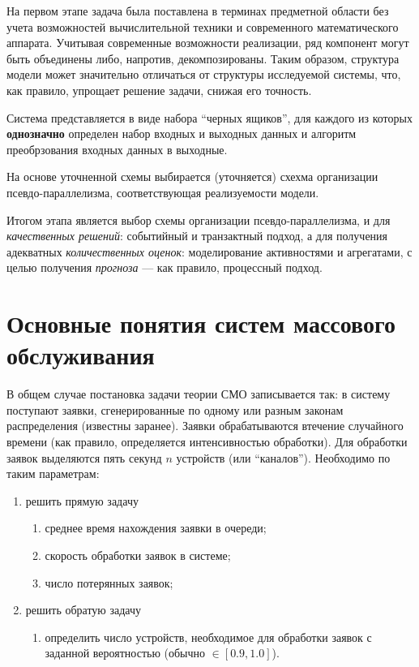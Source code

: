 \documentclass[12pt]{article}
\begin{document}
На первом этапе задача была поставлена в терминах предметной области без учета возможностей вычислительной техники и современного математического аппарата. Учитывая современные возможности реализации, ряд компонент могут быть объединены либо, напротив, декомпозированы. Таким образом, структура модели может значительно отличаться от структуры исследуемой системы, что, как правило, упрощает решение задачи, снижая его точность.

Система представляется в виде набора \enquote{черных ящиков}, для каждого из которых \textbf{однозначно} определен набор входных и выходных данных и алгоритм преобрзования входных данных в выходные.

На основе уточненной схемы выбирается (уточняется) схехма организации псевдо-параллелизма, соответствующая реализуемости модели.

Итогом этапа является выбор схемы организации псевдо-параллелизма, и для \emph{качественных решений}: событийный и транзактный подход, а для получения адекватных \emph{количественных оценок}: моделирование активностями и агрегатами, с целью получения \emph{прогноза} --- как правило, процессный подход.

\newpage
\section{Основные понятия систем массового обслуживания}
В общем случае постановка задачи теории СМО записывается так: в систему поступают заявки, сгенерированные по одному или разным законам распределения (известны заранее). Заявки обрабатываются втечение случайного времени (как правило, определяется интенсивностью обработки). Для обработки заявок выделяются пять секунд $n$ устройств (или \enquote{каналов}). Необходимо по таким параметрам:
\begin{enumerate}
    \item решить прямую задачу
    \begin{enumerate}
        \item среднее время нахождения заявки в очереди;
        \item скорость обработки заявок в системе;
        \item число потерянных заявок;
    \end{enumerate}
    \item решить обратую задачу
    \begin{enumerate}
        \item определить число устройств, необходимое для обработки заявок с заданной вероятностью (обычно $\in [0.9, 1.0]$).\\
    \end{enumerate}
\end{enumerate}
\end{document}
